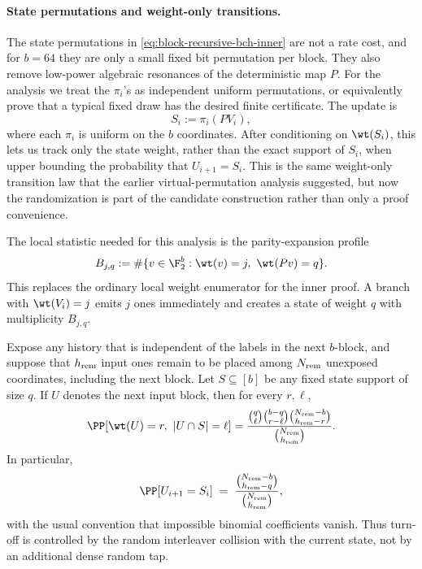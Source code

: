 \paragraph{State permutations and weight-only transitions.}
The state permutations in \eqref{eq:block-recursive-bch-inner} are not a rate cost, and for \(b=64\) they are only a
small fixed bit permutation per block.  They also remove low-power algebraic resonances of the deterministic map \(P\).
For the analysis we treat the \(\pi_i\)'s as independent uniform permutations, or equivalently prove that a typical
fixed draw has the desired finite certificate.  The update is
\begin{equation}
\label{eq:block-recursive-virtual-perm}
S_i := \pi_i(PV_i),
\end{equation}
where each \(\pi_i\) is uniform on the \(b\) coordinates.  After conditioning on \(\wt(S_i)\), this lets us track only
the state weight, rather than the exact support of \(S_i\), when upper bounding the probability that \(U_{i+1}=S_i\).
This is the same weight-only transition law that the earlier virtual-permutation analysis suggested, but now the
randomization is part of the candidate construction rather than only a proof convenience.

The local statistic needed for this analysis is the parity-expansion profile
\begin{equation}
\label{eq:block-recursive-expansion-profile}
B_{j,q}
:=
\#\{v\in\F_2^b:\wt(v)=j,\ \wt(Pv)=q\}.
\end{equation}
This replaces the ordinary local weight enumerator for the inner proof.  A branch with \(\wt(V_i)=j\) emits \(j\)
ones immediately and creates a state of weight \(q\) with multiplicity \(B_{j,q}\).

\begin{lemma}
\label{lem:block-recursive-one-block-law}
Expose any history that is independent of the labels in the next \(b\)-block, and suppose that \(h_{\rm rem}\) input
ones remain to be placed among \(N_{\rm rem}\) unexposed coordinates, including the next block.  Let
\(S\subseteq[b]\) be any fixed state support of size \(q\).  If \(U\) denotes the next input block, then for every
\(r,\ell\),
\begin{equation}
\label{eq:block-recursive-overlap-law}
\PP[\wt(U)=r,\ |U\cap S|=\ell]
=
\frac{\binom{q}{\ell}\binom{b-q}{r-\ell}\binom{N_{\rm rem}-b}{h_{\rm rem}-r}}
{\binom{N_{\rm rem}}{h_{\rm rem}}}.
\end{equation}
In particular,
\begin{equation}
\label{eq:block-recursive-collision-prob}
\PP[U_{i+1}=S_i]
\;=\;
\frac{\binom{N_{\rm rem}-b}{h_{\rm rem}-q}}{\binom{N_{\rm rem}}{h_{\rm rem}}},
\end{equation}
with the usual convention that impossible binomial coefficients vanish.  Thus turn-off is controlled by the random
interleaver collision with the current state, not by an additional dense random tap.
\end{lemma}

